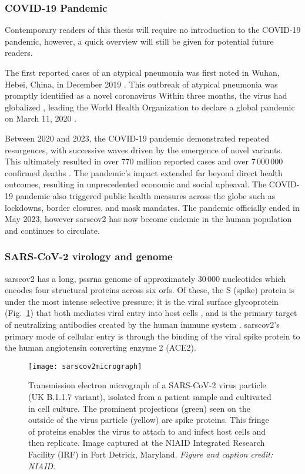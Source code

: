 \subsubsection{COVID-19 Pandemic}
Contemporary readers of this thesis will require no introduction to the COVID-19 pandemic, however, a quick overview will still be given for potential future readers.

The first reported cases of an atypical pneumonia was first noted in Wuhan, Hebei, China, in December 2019 \citep{zhou2020pneumonia}.
This outbreak of atypical pneumonia was promptly identified as a novel coronavirus \citep{wu2020new}
Within three months, the virus had globalized \cite{dong2020interactive}, leading the World Health Organization to declare a global pandemic on March 11, 2020 \cite{healthorganization2020coronavirus}.

Between 2020 and 2023, the COVID-19 pandemic demonstrated repeated resurgences, with successive waves driven by the emergence of novel variants.
This ultimately resulted in over 770 million reported cases and over 7\,000\,000 confirmed deaths \citep{ourworldindata-covid-explorer}.
The pandemic's impact extended far beyond direct health outcomes, resulting in unprecedented economic and social upheaval.
The COVID-19 pandemic also triggered public health measures across the globe such as lockdowns, border closures, and mask mandates.
The pandemic officially ended in May 2023, however \gls{sarscov2} has now become endemic in the human population and continues to circulate.

\subsubsection{SARS-CoV-2 virology and genome}
\gls{sarscov2} has a long, \gls{pssrna} genome of approximately 30\,000 nucleotides which encodes four structural proteins across six \gls{orf}s.
Of these, the S (spike) protein is under the most intense selective pressure; it is the viral surface glycoprotein (Fig.~\ref{fig:sarscov2micrograph}) that both mediates viral entry into host cells \citep{zhu2021molecular}, and is the primary target of neutralizing antibodies created by the human immune system \citep{v2021coronavirus}.
\gls{sarscov2}'s primary mode of cellular entry is through the binding of the viral spike protein to the human angiotensin converting enzyme 2 (ACE2).

\begin{figure}[ht]
  \centering
  \texttt{[image: sarscov2micrograph]}
  \caption[SARS-CoV-2 electron micrograph]{Transmission electron micrograph of a SARS-CoV-2 virus particle (UK B.1.1.7 variant), isolated from a patient sample and cultivated in cell culture. The prominent projections (green) seen on the outside of the virus particle (yellow) are spike proteins. This fringe of proteins enables the virus to attach to and infect host cells and then replicate. Image captured at the NIAID Integrated Research Facility (IRF) in Fort Detrick, Maryland.
  \textit{Figure and caption credit: NIAID}.
  }
  \label{fig:sarscov2micrograph}
\end{figure}

